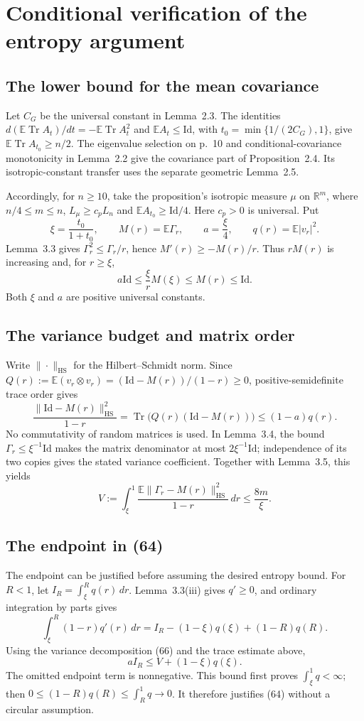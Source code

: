 \documentclass[10pt]{article}
\begin{document}
\section*{Conditional verification of the entropy argument}
\subsection*{The lower bound for the mean covariance}
Let \(C_G\) be the universal constant in Lemma 2.3. The identities \(d(\mathbb E\operatorname{Tr}A_t)/dt=-\mathbb E\operatorname{Tr}A_t^2\) and \(\mathbb EA_t\le\mathrm{Id}\), with \(t_0=\min\{1/(2C_G),1\}\), give \(\mathbb E\operatorname{Tr}A_{t_0}\ge n/2\). The eigenvalue selection on p. 10 and conditional-covariance monotonicity in Lemma 2.2 give the covariance part of Proposition 2.4. Its isotropic-constant transfer uses the separate geometric Lemma 2.5.\par
Accordingly, for \(n\ge10\), take the proposition’s isotropic measure \(\mu\) on \(\mathbb R^m\), where \(n/4\le m\le n\), \(L_\mu\ge c_pL_n\) and \(\mathbb EA_{t_0}\ge\mathrm{Id}/4\). Here \(c_p>0\) is universal. Put \[\xi=\frac{t_0}{1+t_0},\qquad M(r)=\mathbb E\Gamma_r,\qquad
 a=\frac{\xi}{4},\qquad q(r)=\mathbb E|v_r|^2.\] Lemma 3.3 gives \(\Gamma_r^2\le\Gamma_r/r\), hence \(M'(r)\ge-M(r)/r\). Thus \(rM(r)\) is increasing and, for \(r\ge\xi\), \[a\mathrm{Id}\le \frac{\xi}{r}M(\xi)\le M(r)\le\mathrm{Id}.\] Both \(\xi\) and \(a\) are positive universal constants.\par
\subsection*{The variance budget and matrix order}
Write \(\|\cdot\|_{\mathrm{HS}}\) for the Hilbert–Schmidt norm. Since \(Q(r):=\mathbb E(v_r\otimes v_r)=(\mathrm{Id}-M(r))/(1-r)\ge0\), positive-semidefinite trace order gives \[\frac{\|\mathrm{Id}-M(r)\|_{\mathrm{HS}}^2}{1-r}
 =\operatorname{Tr}\bigl(Q(r)(\mathrm{Id}-M(r))\bigr)\le(1-a)q(r).\] No commutativity of random matrices is used. In Lemma 3.4, the bound \(\Gamma_r\le\xi^{-1}\mathrm{Id}\) makes the matrix denominator at most \(2\xi^{-1}\mathrm{Id}\); independence of its two copies gives the stated variance coefficient. Together with Lemma 3.5, this yields \[V:=\int_\xi^1
 \frac{\mathbb E\|\Gamma_r-M(r)\|_{\mathrm{HS}}^2}{1-r}\,dr
 \le \frac{8m}{\xi}.\]\par
\subsection*{The endpoint in (64)}
The endpoint can be justified before assuming the desired entropy bound. For \(R<1\), let \(I_R=\int_\xi^R q(r)\,dr\). Lemma 3.3(iii) gives \(q'\ge0\), and ordinary integration by parts gives \[\int_\xi^R(1-r)q'(r)\,dr
 =I_R-(1-\xi)q(\xi)+(1-R)q(R).\] Using the variance decomposition (66) and the trace estimate above, \[aI_R\le V+(1-\xi)q(\xi).\] The omitted endpoint term is nonnegative. This bound first proves \(\int_\xi^1q<\infty\); then \(0\le(1-R)q(R)\le\int_R^1q\to0\). It therefore justifies (64) without a circular assumption.\par
\end{document}
